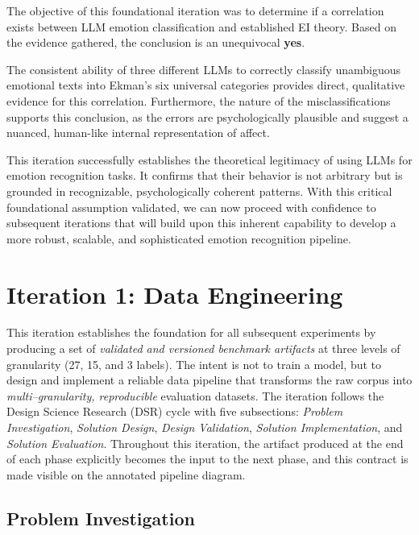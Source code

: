 The objective of this foundational iteration was to determine if a correlation exists between LLM emotion classification and established EI theory. Based on the evidence gathered, the conclusion is an unequivocal \textbf{yes}.

The consistent ability of three different LLMs to correctly classify unambiguous emotional texts into Ekman's six universal categories provides direct, qualitative evidence for this correlation. Furthermore, the nature of the misclassifications supports this conclusion, as the errors are psychologically plausible and suggest a nuanced, human-like internal representation of affect.

This iteration successfully establishes the theoretical legitimacy of using LLMs for emotion recognition tasks. It confirms that their behavior is not arbitrary but is grounded in recognizable, psychologically coherent patterns. With this critical foundational assumption validated, we can now proceed with confidence to subsequent iterations that will build upon this inherent capability to develop a more robust, scalable, and sophisticated emotion recognition pipeline.
\section{Iteration 1: Data Engineering}

This iteration establishes the foundation for all subsequent experiments by producing a set of \emph{validated and versioned benchmark artifacts} at three levels of granularity (27, 15, and 3 labels). The intent is not to train a model, but to design and implement a reliable data pipeline that transforms the raw corpus into \emph{multi--granularity, reproducible} evaluation datasets. The iteration follows the Design Science Research (DSR) cycle with five subsections: \emph{Problem Investigation}, \emph{Solution Design}, \emph{Design Validation}, \emph{Solution Implementation}, and \emph{Solution Evaluation}. Throughout this iteration, the artifact produced at the end of each phase explicitly becomes the input to the next phase, and this contract is made visible on the annotated pipeline diagram.

\subsection{Problem Investigation}

